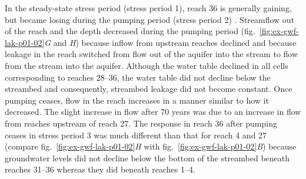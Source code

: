 In the steady-state stress period (stress period 1), reach 36 is generally gaining, but became losing during the pumping period (stress period 2) . Streamflow out of the reach and the depth decreased during the pumping period (fig.~\ref{fig:ex-gwf-lak-p01-02}\textit{G} and \textit{H}) because inflow from upstream reaches declined and because leakage in the reach switched from flow out of the aquifer into the stream to flow from the stream into the aquifer. Although the water table declined in all cells corresponding to reaches 28--36, the water table did not decline below the streambed and consequently, streambed leakage did not become constant. Once pumping ceases, flow in the reach increases in a manner similar to how it decreased. The slight increase in flow after 70 years was due to an increase in flow from reaches upstream of reach 27. The response in reach 36 after pumping ceases in stress period 3 was much different than that for reach 4 and 27 (compare fig.~\ref{fig:ex-gwf-lak-p01-02}\textit{H} with fig.~\ref{fig:ex-gwf-lak-p01-02}\textit{B}) because groundwater levels did not decline below the bottom of the streambed beneath reaches 31--36 whereas they did beneath reaches 1--4. 
